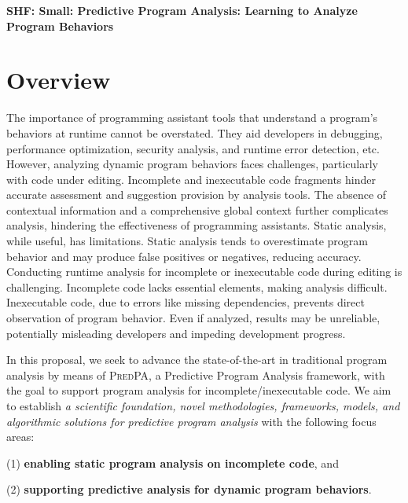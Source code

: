 \documentclass[11pt]{article}
\newcommand{\tool}{\textsc{PredPA}\xspace}
\begin{document}



\begin{center}
  {\bf SHF: Small: Predictive Program Analysis: Learning to Analyze Program Behaviors}
\end{center}
\vspace{-.1in}



\section{Overview}

The importance of programming assistant tools that understand a
program's behaviors at runtime cannot be overstated. They aid
developers in debugging, performance optimization, security analysis,
and runtime error detection, etc.
However, analyzing dynamic program behaviors faces challenges,
particularly with code under editing. Incomplete and inexecutable code
fragments hinder accurate assessment and suggestion provision by
analysis tools. The absence of contextual information and a
comprehensive global context further complicates analysis, hindering
the effectiveness of programming assistants. Static analysis, while
useful, has limitations. Static analysis tends to overestimate program
behavior and may produce false positives or negatives, reducing
accuracy. Conducting runtime analysis for incomplete or inexecutable
code during editing is challenging. Incomplete code lacks essential
elements, making analysis difficult. Inexecutable code, due to errors
like missing dependencies, prevents direct observation of program
behavior. Even if analyzed, results may be unreliable, potentially
misleading developers and impeding development progress.


In this proposal, we seek to advance the state-of-the-art in
traditional program analysis by means of {\tool}, a Predictive Program
Analysis framework, with the goal to support program analysis for
incomplete/inexecutable code. We aim to establish {\em a scientific
  foundation, novel methodologies, frameworks, models, and algorithmic
  solutions for predictive program analysis} with the following focus
areas:


(1) {\bf enabling static program analysis on incomplete code}, and

(2) {\bf supporting predictive analysis for dynamic program behaviors}.
\end{document}
